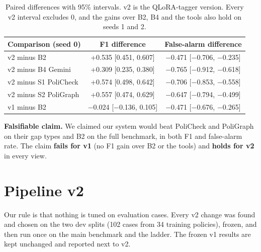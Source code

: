 \documentclass[11pt,a4paper]{article}
\begin{document}
\begin{table}[H]
\centering
\small
\begin{tabular}{lcc}
\toprule
Comparison (seed 0) & F1 difference & False-alarm difference \\
\midrule
v2 minus B2 & +0.535 [0.451, 0.607] & $-$0.471 [$-$0.706, $-$0.235] \\
v2 minus B4 Gemini & +0.309 [0.235, 0.380] & $-$0.765 [$-$0.912, $-$0.618] \\
v2 minus S1 PoliCheck & +0.574 [0.498, 0.642] & $-$0.706 [$-$0.853, $-$0.558] \\
v2 minus S2 PoliGraph & +0.557 [0.474, 0.629] & $-$0.647 [$-$0.794, $-$0.499] \\
v1 minus B2 & $-$0.024 [$-$0.136, 0.105] & $-$0.471 [$-$0.676, $-$0.265] \\
\bottomrule
\end{tabular}
\caption{Paired differences with 95\% intervals. v2 is the QLoRA-tagger version. Every v2 interval
excludes 0, and the gains over B2, B4 and the tools also hold on seeds 1 and 2.}
\label{tab:paired}
\end{table}

\textbf{Falsifiable claim.} We claimed our system would beat PoliCheck and PoliGraph on their gap
types and B2 on the full benchmark, in both F1 and false-alarm rate. The claim \textbf{fails for v1}
(no F1 gain over B2 or the tools) and \textbf{holds for v2} in every view.

\section{Pipeline v2}
\label{sec:v2}

Our rule is that nothing is tuned on evaluation cases. Every v2 change was found and chosen on the
two dev splits (102 cases from 34 training policies), frozen, and then run once on the main
benchmark and the ladder. The frozen v1 results are kept unchanged and reported next to v2.
\end{document}
